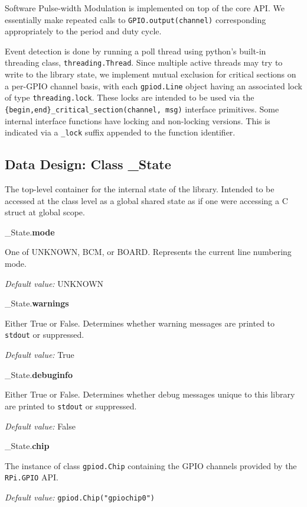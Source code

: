 \documentclass[12pt]{article}
\begin{document}
Software Pulse-width Modulation is implemented on top of the core API.
We essentially make repeated calls to \texttt{GPIO.output(channel)} corresponding appropriately to the period and duty cycle.

Event detection is done by running a poll thread using python's built-in threading class, \texttt{threading.Thread}. Since multiple active threads may try to write to the library state, we implement mutual exclusion for critical sections on a per-GPIO channel basis, with each \texttt{gpiod.Line} object having an associated lock of type \texttt{threading.lock}. These locks are intended to be used via the \texttt{\{begin,end\}\_critical\_section(channel, msg)} interface primitives. Some internal interface functions have locking and non-locking versions. This is indicated via a \texttt{\_lock} suffix appended to the function identifier.

\subsection{Data Design: Class \_State} \label{class_state}

The top-level container for the internal state of the library. Intended to be accessed at the class level as a global shared state as if one were accessing a C struct at global scope. 

\medskip

\noindent \_State.\textbf{mode}

One of UNKNOWN, BCM, or BOARD. Represents the current line numbering mode.

\textit{Default value:} UNKNOWN

\noindent \_State.\textbf{warnings}

Either True or False. Determines whether warning messages are printed to \texttt{stdout} or suppressed.

\textit{Default value:} True

\noindent \_State.\textbf{debuginfo}

Either True or False. Determines whether debug messages unique to this library are printed to \texttt{stdout} or suppressed.

\textit{Default value:} False

\noindent \_State.\textbf{chip}

The instance of class \texttt{gpiod.Chip} containing the GPIO channels provided by the \texttt{RPi.GPIO} API.

\textit{Default value:} \texttt{gpiod.Chip("gpiochip0")}
\end{document}
